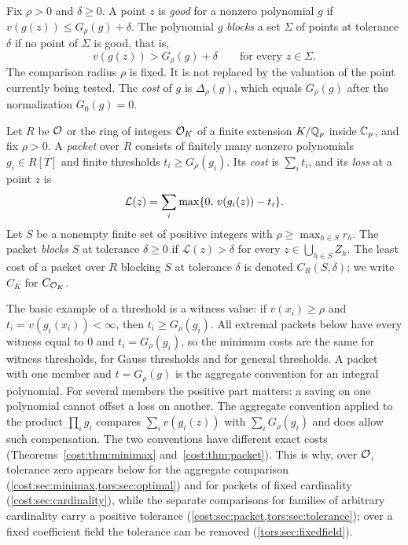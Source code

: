 \begin{definition}\label{cost:def:aggregate}
Fix $\rho>0$ and $\delta\ge0$. A point $z$ is \emph{good} for a nonzero polynomial $g$ if
$v(g(z))\le G_\rho(g)+\delta$. The polynomial $g$ \emph{blocks} a set $\Sigma$ of points at
tolerance $\delta$ if no point of $\Sigma$ is good, that is,
\[
 v(g(z))>G_\rho(g)+\delta\qquad\text{for every }z\in\Sigma.
\]
The comparison radius $\rho$ is fixed. It is not replaced by the valuation of the point
currently being tested. The \emph{cost} of $g$ is $\Delta_\rho(g)$, which equals $G_\rho(g)$
after the normalization $G_0(g)=0$.
\end{definition}

\begin{definition}\label{cost:def:packet}
Let $R$ be $\mathcal{O}$ or the ring of integers $\mathcal{O}_K$ of a finite extension $K/\mathbb{Q}_p$ inside $\mathbb{C}_p$,
and fix $\rho>0$. A \emph{packet} over $R$ consists of finitely many nonzero polynomials
$g_i\in R[T]$ and finite thresholds $t_i\ge G_\rho(g_i)$. Its \emph{cost} is $\sum_it_i$,
and its \emph{loss} at a point $z$ is
\[
 \mathcal L(z)=\sum_i\max\{0,\,v(g_i(z))-t_i\}.
\]
Let $S$ be a nonempty finite set of positive integers with $\rho\ge\max_{h\in S}r_h$. The
packet \emph{blocks} $S$ at tolerance $\delta\ge0$ if $\mathcal L(z)>\delta$ for every
$z\in\bigcup_{h\in S}Z_h$. The least cost of a packet over $R$ blocking $S$ at tolerance
$\delta$ is denoted $C_R(S,\delta)$; we write $C_K$ for $C_{\mathcal{O}_K}$.
\end{definition}

The basic example of a threshold is a witness value: if $v(x_i)\ge\rho$ and
$t_i=v(g_i(x_i))<\infty$, then $t_i\ge G_\rho(g_i)$. All extremal packets below have every
witness equal to $0$ and $t_i=G_\rho(g_i)$, so the minimum costs are the same for witness
thresholds, for Gauss thresholds and for general thresholds. A packet with one member and
$t=G_\rho(g)$ is the aggregate convention for an integral polynomial. For several members the
positive part matters: a saving on one polynomial cannot offset a loss on another. The
aggregate convention applied to the product $\prod_ig_i$ compares
$\sum_iv(g_i(z))$ with $\sum_iG_\rho(g_i)$ and does allow such compensation. The two
conventions have different exact costs (Theorems~\ref{cost:thm:minimax} and~\ref{cost:thm:packet}).
This is why, over $\mathcal{O}$, tolerance zero appears below for the aggregate comparison
(\cref{cost:sec:minimax,tors:sec:optimal}) and for packets of fixed cardinality
(\cref{cost:sec:cardinality}), while the separate comparisons for families of arbitrary
cardinality carry a positive tolerance (\cref{cost:sec:packet,tors:sec:tolerance}); over a
fixed coefficient field the tolerance can be removed (\cref{tors:sec:fixedfield}).

